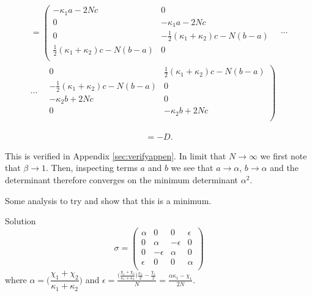 \documentclass[11pt,a4paper]{article}
\numberwithin{equation}{section}
\begin{document}
	\[
	\begin{multlined}
	= \left(\begin{matrix}
	-\kappa_1 a - 2Nc & 0 \\
	0 & -\kappa_1 a - 2Nc \\ 
	0 & -\frac{1}{2}(\kappa_1 + \kappa_2)c - N(b-a)	\\ 
	\frac{1}{2}(\kappa_1 + \kappa_2)c - N(b-a) & 0 \\ 
	\end{matrix}\right. \quad\dotsm  \\
	\dotsm\quad\left.\begin{matrix}
	0 & \frac{1}{2}(\kappa_1 + \kappa_2)c - N(b-a)     \\
	-\frac{1}{2}(\kappa_1 + \kappa_2)c - N(b-a) & 0     \\
	-\kappa_2 b + 2Nc & 0     \\
	0 & -\kappa_2 b + 2Nc		\\
	\end{matrix}\right)
	\end{multlined}
	\]   
	
	\begin{align*}
	&= -D.&	
	\end{align*}
	
	This is verified in Appendix \ref{sec:verifyappen}. In limit that $N \rightarrow \infty$ we first note that $\beta \rightarrow 1$. Then, inspecting terms $a$ and $b$ we see that $a \rightarrow \alpha$, $b \rightarrow \alpha$ and the determinant therefore converges on the minimum determinant $\alpha^2$.
	
	Some analysis to try and show that this is a minimum.
	
	\iffalse

	Solution
	\begin{equation*}
	\sigma = \begin{pmatrix}
	\alpha & 0 & 0 & \epsilon\\
	0 & \alpha & -\epsilon & 0\\
	0 & -\epsilon & \alpha & 0 \\
	\epsilon & 0 & 0 & \alpha\\
	\end{pmatrix}
	\end{equation*}	
	where $\alpha = \Big(\dfrac{\chi_1 + \chi_2}{\kappa_1 + \kappa_2}\Big)$ and $\epsilon = \frac{\big(\frac{\chi_1 + \chi_2}{\kappa_1 + \kappa_2}\big) \frac{\kappa_1}{2} - \frac{\chi_1}{2}}{N} = \frac{\alpha \kappa_1 - \chi_1}{2N}$.
	
\end{document}
